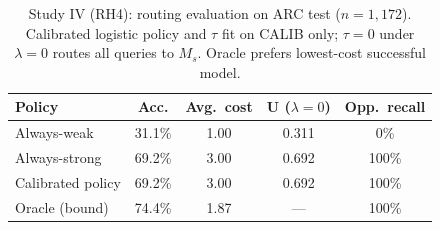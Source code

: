 \begin{table}[t]
  \centering
  \small
  \begin{tabular}{lcccc}
    \toprule
    \textbf{Policy} & \textbf{Acc.} & \textbf{Avg.\ cost} & $\boldsymbol{U}$ ($\lambda{=}0$) & \textbf{Opp.\ recall} \\
    \midrule
    Always-weak    & 31.1\% & 1.00 & 0.311 & 0\% \\
    Always-strong  & 69.2\% & 3.00 & 0.692 & 100\% \\
    Calibrated policy & 69.2\% & 3.00 & 0.692 & 100\% \\
    Oracle (bound) & 74.4\% & 1.87 & --- & 100\% \\
    \bottomrule
  \end{tabular}
  \caption{Study IV (RH4): routing evaluation on ARC test ($n{=}1{,}172$). Calibrated logistic policy and $\tau$ fit on CALIB only; $\tau{=}0$ under $\lambda{=}0$ routes all queries to $M_s$. Oracle prefers lowest-cost successful model.}
  \label{tab:routing}
\end{table}
